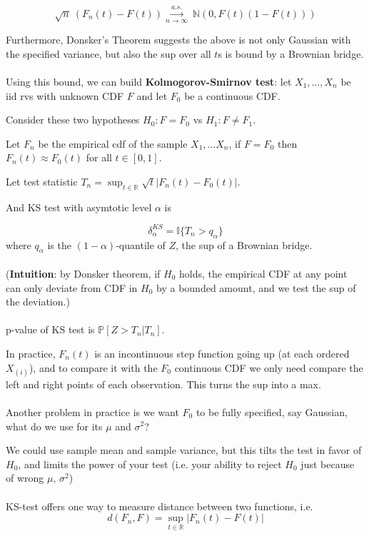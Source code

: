 \documentclass{article}
\begin{document}
$$
\sqrt{n} ~ (F_n(t) - F(t)) \overset{a.s.}{\underset{n \to \infty}{\longrightarrow}} ~ \mathbb{N}(0, F(t) (1 - F(t)))
$$

Furthermore, Donsker's Theorem suggests the above is not only Gaussian with the specified variance, but also the sup over all $t$s is bound by a Brownian bridge.
\\
\\
Using this bound, we can build \textbf{Kolmogorov-Smirnov test}: let $X_1, \dots, X_n$ be iid rvs with unknown CDF $F$ and let $F_0$ be a continuous CDF.

Consider these two hypotheses $H_0: F = F_0$ vs $H_1: F \neq F_1$.

Let $F_n$ be the empirical cdf of the sample $X_1, \dots X_n$, if $F = F_0$ then $F_n(t) \approx F_0(t)$ for all $t \in [0, 1]$.

Let test statistic $T_n = \sup_{t \in \mathbb{R}} \sqrt{t}|F_n(t) - F_0(t)|$.

And KS test with asymtotic level $\alpha$ is

$$
\delta_{\alpha}^{KS} = \mathbb{I} \{T_n > q_{\alpha}\}
$$
where $q_{\alpha}$ is the $(1-\alpha)$-quantile of $Z$, the sup of a Brownian bridge.
\\
\\
(\textbf{Intuition}: by Donsker theorem, if $H_0$ holds, the empirical CDF at any point can only deviate from CDF in $H_0$ by a bounded amount, and we test the sup of the deviation.)
\\
\\
p-value of KS test is $\mathbb{P}[Z > T_n | T_n]$.

In practice, $F_{n}(t)$ is an incontinuous step function going up (at each ordered $X_{(i)}$),
and to compare it with the $F_0$ continuous CDF we only need compare the left and right points of each observation.
This turns the sup into a max.
\\
\\
Another problem in practice is we want $F_0$ to be fully specified, say Gaussian, what do we use for its $\mu$ and $\sigma^2$?

We could use sample mean and sample variance, but this tilts the test in favor of $H_0$, and limits the power of your test (i.e. your ability to reject $H_0$ just because of wrong $\mu$, $\sigma^2$)
\\
\\
KS-test offers one way to measure distance between two functions, i.e.
$$
d(F_n, F) = \sup_{t \in \mathbb{R}} |F_n(t) - F(t)|
$$
\end{document}
